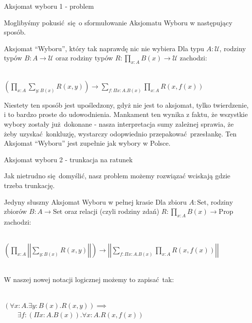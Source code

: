 \documentclass{beamer}
\newcommand{\U}{\mathcal{U}}
\newcommand{\Prop}{\text{Prop}}
\newcommand{\Set}{\text{Set}}
\begin{document}
\begin{frame}{Aksjomat wyboru 1 - problem}

Moglibyśmy pokusić się o sformułowanie Aksjomatu Wyboru w następujący sposób.

\begin{block}{Aksjomat ``Wyboru'', który tak naprawdę nic nie wybiera}
Dla typu $A : \U$, rodziny typów $B : A \to \U$ oraz rodziny typów $R : \prod_{x : A} B(x) \to \U$ zachodzi: \\~\

$\displaystyle
	\left(\prod_{x : A} \sum_{y : B(x)} R(x, y)\right) \to
	\sum_{f : \Pi x : A. B(x)} \prod_{x : A} R(x, f(x))
$
\end{block}

Niestety ten sposób jest upośledzony, gdyż nie jest to aksjomat, tylko twierdzenie, i to bardzo proste do udowodnienia. Mankament ten wynika z faktu, że wszystkie wybory zostały już dokonane - nasza interpretacja sumy zależnej sprawia, że żeby uzyskać konkluzję, wystarczy odopwiednio przepakować przesłankę. Ten Aksjomat ``Wyboru'' jest zupełnie jak wybory w Polsce.

\end{frame}

\begin{frame}{Aksjomat wyboru 2 - trunkacja na ratunek}

Jak nietrudno się domyślić, nasz problem możemy rozwiązać wciskają gdzie trzeba trunkację.

\begin{block}{Jedyny słuszny Aksjomat Wyboru w pełnej krasie}
Dla zbioru $A : \Set$, rodziny zbiorów $B : A \to \Set$ oraz relacji (czyli rodziny zdań) $R : \prod_{x : A} B(x) \to \Prop$ zachodzi: \\~\

$\displaystyle
	\left(\prod_{x : A} \left|\left|\sum_{y : B(x)} R(x, y)\right|\right|\right) \to
	\left|\left|\sum_{f : \Pi x : A. B(x)} \prod_{x : A} R(x, f(x))\right|\right|
$ \\~\

W naszej nowej notacji logicznej możemy to zapisać tak: \\~\

$\displaystyle
	(\forall x : A. \exists y : B(x). R(x, y)) \implies
$ \\
$\displaystyle \qquad
	\exists f : (\Pi x : A. B(x)). \forall x : A. R(x, f(x))
$
\end{block}

\end{frame}
\end{document}
